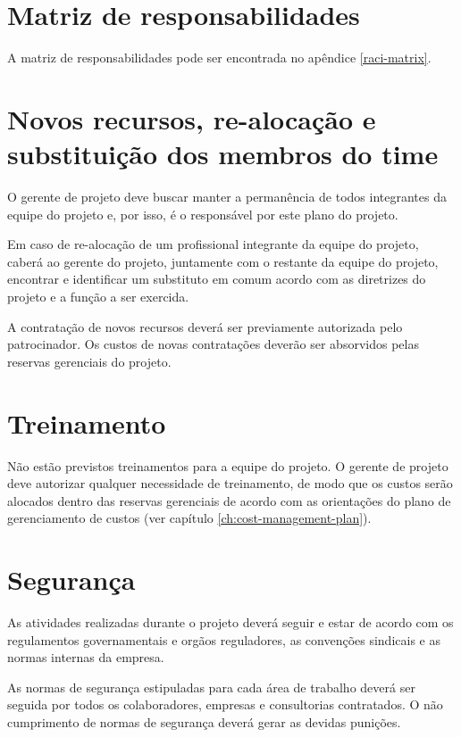 \section{Matriz de responsabilidades}

A matriz de responsabilidades pode ser encontrada no apêndice \ref{raci-matrix}.

\section{Novos recursos, re-alocação e substituição dos membros do time}

O gerente de projeto deve buscar manter a permanência de todos integrantes da equipe do projeto e, por isso, é o responsável por este plano do projeto.

Em caso de re-alocação de um profissional integrante da equipe do projeto, caberá ao gerente do projeto, juntamente com o restante da equipe do projeto, encontrar e identificar um substituto em comum acordo com as diretrizes do projeto e a função a ser exercida. 

A contratação de novos recursos deverá ser previamente autorizada pelo patrocinador. Os custos de novas contratações deverão ser absorvidos pelas reservas gerenciais do projeto.

\section{Treinamento}

Não estão previstos treinamentos para a equipe do projeto. O gerente de projeto deve autorizar qualquer necessidade de treinamento, de modo que os custos serão alocados dentro das reservas gerenciais de acordo com as orientações do plano de gerenciamento de custos (ver capítulo \ref{ch:cost-management-plan}).

\section{Segurança}

As atividades realizadas durante o projeto deverá seguir e estar de acordo com os regulamentos governamentais e orgãos reguladores, as convenções sindicais e as normas internas da empresa.

As normas de segurança estipuladas para cada área de trabalho deverá ser seguida por todos os colaboradores, empresas e consultorias contratados. O não cumprimento de normas de segurança deverá gerar as devidas punições.

